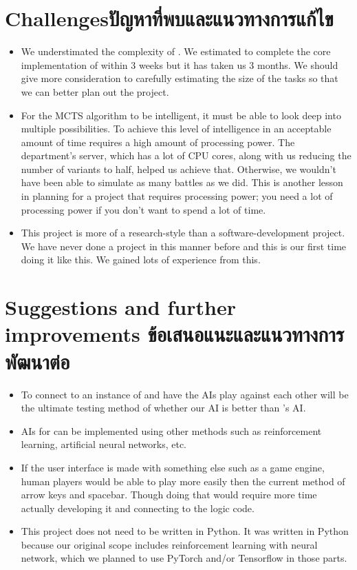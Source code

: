 \section{\ifenglish Challenges\else ปัญหาที่พบและแนวทางการแก้ไข\fi}

\begin{itemize}
    \item We understimated the complexity of \RootB{}. We estimated to complete the core implementation of \RootOurs{} within 3 weeks but it has taken us 3 months. We should give more consideration to carefully estimating the size of the tasks so that we can better plan out the project.
    \item For the MCTS algorithm to be intelligent, it must be able to look deep into multiple possibilities. To achieve this level of intelligence in an acceptable amount of time requires a high amount of processing power. The department's server, which has a lot of CPU cores, along with us reducing the number of variants to half, helped us achieve that. Otherwise, we wouldn't have been able to simulate as many battles as we did. This is another lesson in planning for a project that requires processing power; you need a lot of processing power if you don't want to spend a lot of time.
    \item This project is more of a research-style than a software-development project. We have never done a project in this manner before and this is our first time doing it like this. We gained lots of experience from this.
\end{itemize}

\section{\ifenglish%
Suggestions and further improvements
\else%
ข้อเสนอแนะและแนวทางการพัฒนาต่อ
\fi
}

\begin{itemize}
    \item To connect \RootAI{} to an instance of \RootV{} and have the AIs play against each other will be the ultimate testing method of whether our AI is better than \RootV{}'s AI. 
    \item AIs for \RootB{} can be implemented using other methods such as reinforcement learning, artificial neural networks, etc.
    \item If the user interface is made with something else such as a game engine, human players would be able to play \RootOurs{} more easily then the current method of arrow keys and spacebar. Though doing that would require more time actually developing it and connecting to the logic code.
    \item This project does not need to be written in Python. It was written in Python because our original scope includes reinforcement learning with neural network, which we planned to use PyTorch and/or Tensorflow in those parts.
\end{itemize}


